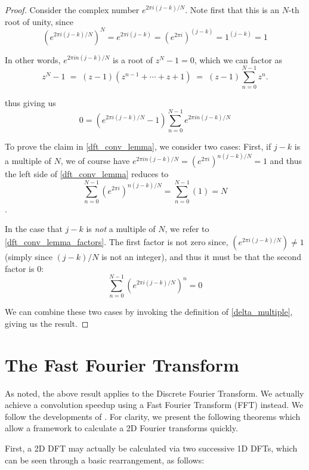 \begin{proof}

Consider the complex number $e^{2\pi i (j-k)/N}$. Note first that this is an $N$-th root of unity, since
\[
\left(e^{2\pi i (j-k)/N}\right)^N = e^{2\pi i (j-k)} = \left(e^{2\pi i}\right)^{(j-k)}
= 1^{(j-k)} = 1
\]

In other words, $e^{2\pi i n(j-k)/N}$ is a root of $z^N -1 = 0$, which we can factor as
\begin{equation}
z^N -1 \;=\; (z-1)\left(z^{n-1} + \cdots + z + 1\right) \;=\; (z-1)\sum_{n=0}^{N-1} z^n .
\end{equation}

thus giving us
\begin{equation} \label{dft_conv_lemma_factors}
0 = \left(e^{2\pi i(j-k)/N} - 1\right) \sum_{n=0}^{N-1} e^{2\pi i n(j-k)/N}
\end{equation}

To prove the claim in \cref{dft_conv_lemma}, we consider two cases: First, if $j-k$ is a multiple of $N$, we of course have $e^{2\pi i n(j-k)/N} = \left(e^{2\pi i}\right)^{n(j-k)/N} = 1$  and thus the left side of \cref{dft_conv_lemma} reduces to 
\[
\sum_{n=0}^{N-1} \left(e^{2\pi i}\right)^{n(j-k)/N} = \sum_{n=0}^{N-1} \left(1\right) = N
\].

In the case that $j-k$ is \textit{not} a multiple of $N$, we refer to \cref{dft_conv_lemma_factors}.
The first factor is not zero since, $\left(e^{2\pi i (j-k)/N}\right) \ne 1$ (simply since $(j-k)/N$ is not an integer), and thus it must be that the second factor is 0:
\[
\sum_{n=0}^{N-1} \left(e^{2\pi i (j-k)/N}\right)^n = 0
\]

We can combine these two cases by invoking the definition of \cref{delta_multiple}, giving us the result.
\end{proof}
		
\section{The Fast Fourier Transform}
As noted, the above result applies to the Discrete Fourier Transform. We actually achieve a convolution speedup using a Fast Fourier Transform (FFT) instead. We follow the developments of \cite{DIPGW}.
For clarity, we present the following theorems which allow a framework to calculate a 2D Fourier transforms quickly.


First, a 2D DFT may actually be calculated via two successive 1D DFTs, which can be
seen through a basic rearrangement, as follows:

